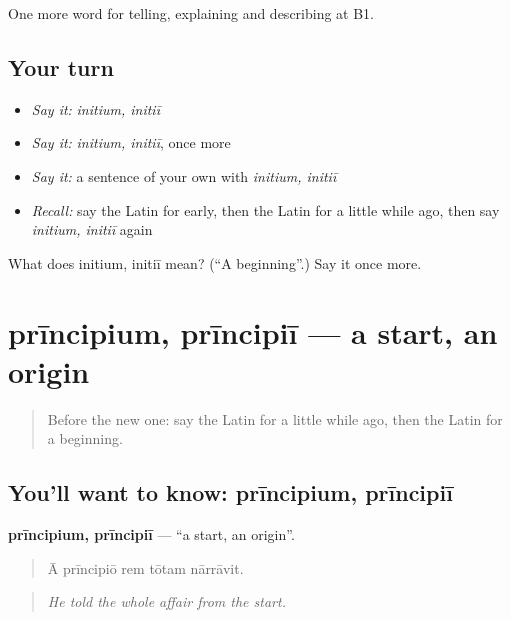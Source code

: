 \begin{grammarlens}[title={What you've built}]
One more word for telling, explaining and describing at B1.
\end{grammarlens}

\subsection*{Your turn}
\begin{itemize}
\raggedright
  \item \emph{Say it:} \emph{initium, initiī}
  \item \emph{Say it:} \emph{initium, initiī}, once more
  \item \emph{Say it:} a sentence of your own with \emph{initium, initiī}
  \item \emph{Recall:} say the Latin for early, then the Latin for a little while ago, then say \emph{initium, initiī} again
\end{itemize}

\begin{tcolorbox}[breakable,colback=teal!4,colframe=teal!35!black,title={Before you move on}]
What does initium, initiī mean? (\textquotedblleft{}A beginning\textquotedblright{}.) Say it once more.
\end{tcolorbox}
\section[prīncipium, prīncipiī]{prīncipium, prīncipiī — a start, an origin}

\label{lesson:LA-C296-principium}



\begin{quote}
Before the new one: say the Latin for a little while ago, then the Latin for a beginning.
\end{quote}

\subsection*{You'll want to know: prīncipium, prīncipiī}
\textbf{prīncipium, prīncipiī} — \textquotedblleft{}a start, an origin\textquotedblright{}.

\begin{quote}
Ā prīncipiō rem tōtam nārrāvit.
\end{quote}

\begin{quote}
\emph{He told the whole affair from the start.}
\end{quote}

